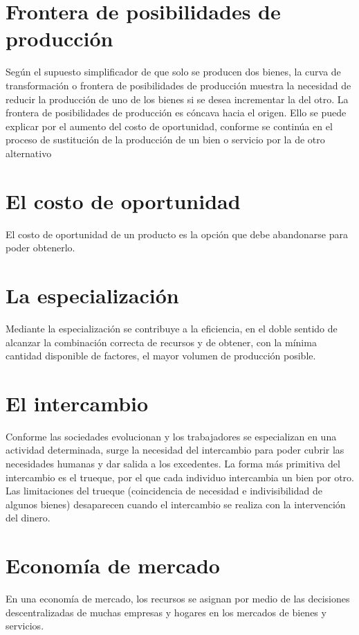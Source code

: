 \documentclass[12pt]{book}
\begin{document}
\section{Frontera de posibilidades de producción}
Según el supuesto simplificador de que solo se producen dos bienes, la curva de transformación o frontera de posibilidades de producción muestra la necesidad de reducir la producción de uno de los bienes si se desea incrementar la del otro.
La frontera de posibilidades de producción es cóncava hacia el origen. Ello se puede explicar por el aumento del costo de oportunidad, conforme se continúa en el proceso de sustitución de la producción de un bien o servicio por la de otro
alternativo

\section{El costo de oportunidad}
El costo de oportunidad de un producto es la opción que debe abandonarse para poder obtenerlo.

\section{La especialización}
Mediante la especialización se contribuye a la eficiencia, en el doble sentido de alcanzar la combinación correcta de recursos y de obtener, con la mínima cantidad disponible de factores, el mayor volumen de producción posible.

\section{El intercambio}
Conforme las sociedades evolucionan y los trabajadores se especializan en una actividad determinada, surge la necesidad del intercambio para poder cubrir las necesidades humanas y dar salida a los excedentes. La forma más primitiva del intercambio es el
trueque, por el que cada individuo intercambia un bien por otro.
Las limitaciones del trueque (coincidencia de necesidad e indivisibilidad de algunos bienes) desaparecen cuando el intercambio se realiza con la intervención del dinero.

\section{Economía de mercado}En una economía de mercado, los recursos se asignan por medio de las decisiones descentralizadas
de muchas empresas y hogares en los mercados de bienes y servicios.
\end{document}
